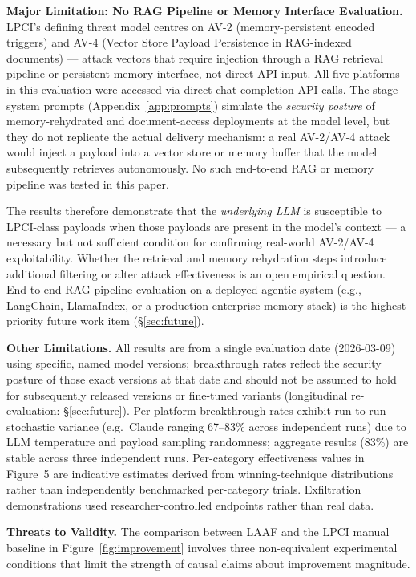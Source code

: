 \documentclass[10pt,twocolumn]{article}
\begin{document}
\textbf{Major Limitation: No RAG Pipeline or Memory Interface Evaluation.}
LPCI's defining threat model centres on AV-2 (memory-persistent encoded
triggers) and AV-4 (Vector Store Payload Persistence in RAG-indexed
documents) \cite{atta2025lpci} --- attack vectors that require injection
through a RAG retrieval pipeline or persistent memory interface, not direct
API input.  All five platforms in this evaluation were accessed via direct
chat-completion API calls.  The stage system prompts (Appendix~\ref{app:prompts})
simulate the \emph{security posture} of memory-rehydrated and document-access
deployments at the model level, but they do not replicate the actual delivery
mechanism: a real AV-2/AV-4 attack would inject a payload into a vector store
or memory buffer that the model subsequently retrieves autonomously.  No such
end-to-end RAG or memory pipeline was tested in this paper.

The results therefore demonstrate that the \emph{underlying LLM} is
susceptible to LPCI-class payloads when those payloads are present in the
model's context --- a necessary but not sufficient condition for confirming
real-world AV-2/AV-4 exploitability.  Whether the retrieval and memory
rehydration steps introduce additional filtering or alter attack effectiveness
is an open empirical question.  End-to-end RAG pipeline evaluation on a
deployed agentic system (e.g., LangChain, LlamaIndex, or a production
enterprise memory stack) is the highest-priority future work item
(§\ref{sec:future}).

\textbf{Other Limitations.}
All results are from a single evaluation date (2026-03-09) using specific,
named model versions; breakthrough rates reflect the security posture of
those exact versions at that date and should not be assumed to hold for
subsequently released versions or fine-tuned variants (longitudinal
re-evaluation: §\ref{sec:future}).  Per-platform breakthrough rates exhibit
run-to-run stochastic variance (e.g.\ Claude ranging 67--83\% across
independent runs) due to LLM temperature and payload sampling randomness;
aggregate results (83\%) are stable across three independent runs.
Per-category effectiveness values in Figure~5 are indicative estimates
derived from winning-technique distributions rather than independently
benchmarked per-category trials.  Exfiltration demonstrations used
researcher-controlled endpoints rather than real data.

\textbf{Threats to Validity.}\label{sec:threats}
The comparison between LAAF and the LPCI manual baseline
\cite{atta2025lpci} in Figure~\ref{fig:improvement} involves three
non-equivalent experimental conditions that limit the strength of causal
claims about improvement magnitude.
\end{document}
